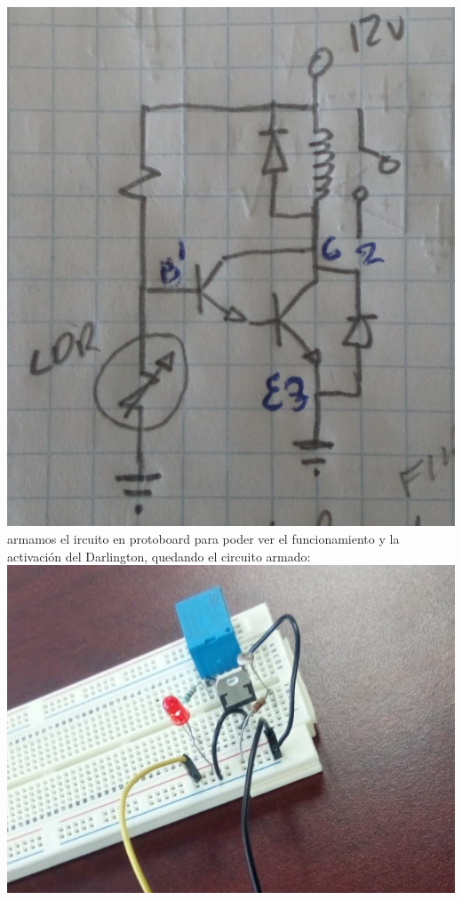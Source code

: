 \documentclass[10pt,a4paper]{article}
\begin{document}
 \centering
 \includegraphics[scale=0.1]{8.jpeg}\\

armamos el ircuito en protoboard para poder ver el funcionamiento y la activación del Darlington, quedando el circuito armado: \\

\centering
\includegraphics[scale=0.4]{9.jpeg}\\
\end{document}
